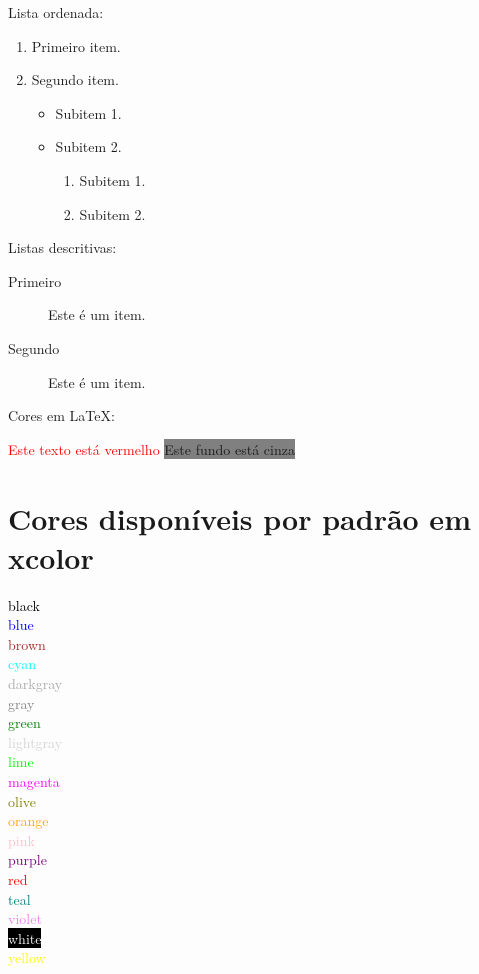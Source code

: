 \documentclass{article}
\begin{document}
	Lista ordenada:
	
	\begin{enumerate}
		\item Primeiro item.
		\item Segundo item.
		\begin{itemize}
			\item Subitem 1.
			\item Subitem 2.
			\begin{enumerate}
				\item Subitem 1.
				\item Subitem 2.
			\end{enumerate}
		\end{itemize}
		
	\end{enumerate}
	
	Listas descritivas:
	
	\begin{description}
		\item[Primeiro] Este é um item.
		\item[Segundo] Este é um item.
	\end{description}
	
	
	\begin{center}
		Cores em LaTeX:
	\end{center}	
	
	\textcolor{red}{Este texto está vermelho} %
	\colorbox{gray}{Este fundo está cinza} %
	
	\section*{Cores disponíveis por padrão em xcolor}
	
	\textcolor{black}{black}\\
	\textcolor{blue}{blue}\\
	\textcolor{brown}{brown}\\
	\textcolor{cyan}{cyan}\\
	\textcolor{darkgray}{darkgray}\\
	\textcolor{gray}{gray}\\
	\textcolor{green}{green}\\
	\textcolor{lightgray}{lightgray}\\
	\textcolor{lime}{lime}\\
	\textcolor{magenta}{magenta}\\
	\textcolor{olive}{olive}\\
	\textcolor{orange}{orange}\\
	\textcolor{pink}{pink}\\
	\textcolor{purple}{purple}\\
	\textcolor{red}{red}\\
	\textcolor{teal}{teal}\\
	\textcolor{violet}{violet}\\
	\colorbox{black}{\textcolor{white}{white}}\\
	\textcolor{yellow}{yellow}
	
\end{document}
